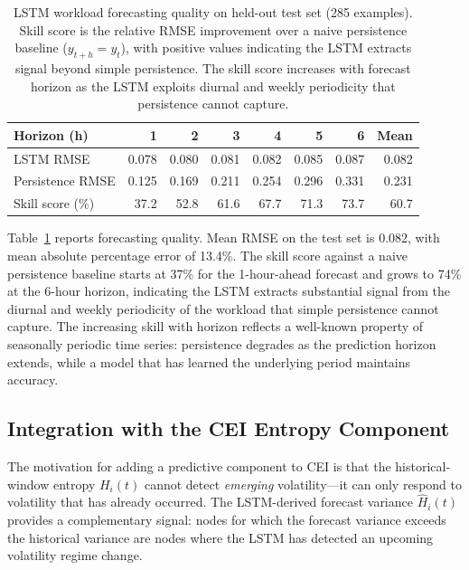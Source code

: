 \documentclass[runningheads]{llncs}
\begin{document}
\begin{table}[ht]
\caption{LSTM workload forecasting quality on held-out test set (285 examples). Skill score is the relative RMSE improvement over a naive persistence baseline ($y_{t+h} = y_t$), with positive values indicating the LSTM extracts signal beyond simple persistence. The skill score increases with forecast horizon as the LSTM exploits diurnal and weekly periodicity that persistence cannot capture.}
\label{tab:lstm}
\centering
\footnotesize
\setlength{\tabcolsep}{6pt}
\begin{tabular}{lrrrrrrr}
\toprule
Horizon (h) & 1 & 2 & 3 & 4 & 5 & 6 & Mean \\
\midrule
LSTM RMSE          & 0.078 & 0.080 & 0.081 & 0.082 & 0.085 & 0.087 & 0.082 \\
Persistence RMSE   & 0.125 & 0.169 & 0.211 & 0.254 & 0.296 & 0.331 & 0.231 \\
Skill score (\%)   & 37.2  & 52.8  & 61.6  & 67.7  & 71.3  & 73.7  & 60.7 \\
\bottomrule
\end{tabular}
\end{table}

Table~\ref{tab:lstm} reports forecasting quality. Mean RMSE on the test set is 0.082, with mean absolute percentage error of 13.4\%. The skill score against a naive persistence baseline starts at 37\% for the 1-hour-ahead forecast and grows to 74\% at the 6-hour horizon, indicating the LSTM extracts substantial signal from the diurnal and weekly periodicity of the workload that simple persistence cannot capture. The increasing skill with horizon reflects a well-known property of seasonally periodic time series: persistence degrades as the prediction horizon extends, while a model that has learned the underlying period maintains accuracy.

\subsection{Integration with the CEI Entropy Component}

The motivation for adding a predictive component to CEI is that the historical-window entropy $H_i(t)$ cannot detect \emph{emerging} volatility---it can only respond to volatility that has already occurred. The LSTM-derived forecast variance $\hat{H}_i(t)$ provides a complementary signal: nodes for which the forecast variance exceeds the historical variance are nodes where the LSTM has detected an upcoming volatility regime change.
\end{document}

